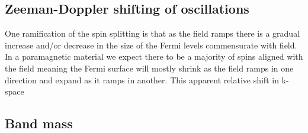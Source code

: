 \subsection{Zeeman-Doppler shifting of oscillations}

One ramification of the spin splitting is that as the field ramps there is a gradual increase and/or decrease in the size of the Fermi levels commensurate with field. In a paramagnetic material we expect there to be a majority of spins aligned with the field meaning the Fermi surface will mostly shrink as the field ramps in one direction and expand as it ramps in another. This apparent relative shift in k-space 


\subsection{Band mass}

